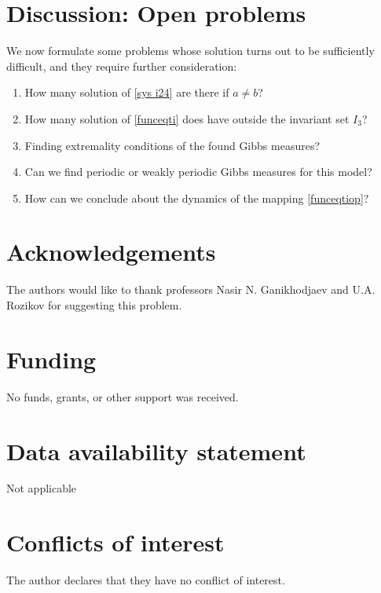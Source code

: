\documentclass[sn-mathphys]{sn-jnl}%
\theoremstyle{thmstyleone}%
\theoremstyle{thmstyletwo}%
\theoremstyle{thmstylethree}%
\begin{document}
\section{Discussion: Open problems}
We now formulate some problems whose solution turns out to be sufficiently difficult, and they require further consideration:
\begin{enumerate}
  \item How many solution of \eqref{sys i24} are there if $a\neq b$?
  \item How many solution of \eqref{funceqti} does have outside the invariant set $I_3$?
  \item Finding extremality conditions of the found Gibbs measures?
  \item Can we find periodic or weakly periodic Gibbs measures for this model?
  \item How can we conclude about the dynamics of the mapping \eqref{funceqtiop}?
\end{enumerate}

\section{Acknowledgements}
The authors would like to thank professors Nasir N. Ganikhodjaev and U.A. Rozikov for suggesting this problem.

\section{Funding}
No funds, grants, or other support was received.


\section{Data availability statement}
Not applicable

\section{Conflicts of interest}
The author declares that they have no conflict of interest.
\end{document}
